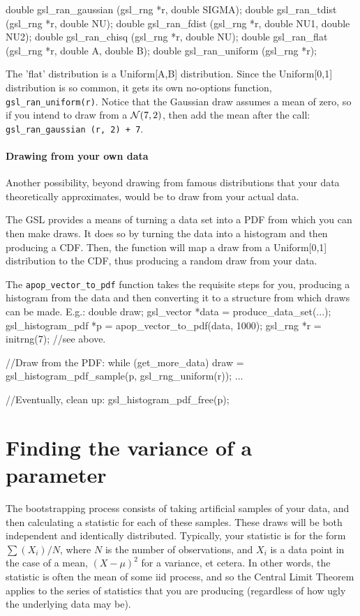 double gsl_ran_gaussian (gsl_rng *r, double SIGMA);
double gsl_ran_tdist (gsl_rng *r, double NU);
double gsl_ran_fdist (gsl_rng *r, double NU1, double NU2);
double gsl_ran_chisq (gsl_rng *r, double NU);
double gsl_ran_flat (gsl_rng *r, double A, double B);
double gsl_ran_uniform (gsl_rng *r);

The 'flat' distribution is a Uniform[A,B] distribution. Since the
Uniform[0,1] distribution is so common, it gets its own no-options
function, {\tt gsl\_ran\_uniform(r)}. Notice that the Gaussian draw
assumes a mean of zero, so if you intend to draw from a ${\cal N}(7,2)$,
then add the mean after the call: {\tt gsl\_ran\_gaussian (r, 2) + 7}.

\paragraph{Drawing from your own data} Another possibility, beyond
drawing from famous distributions that your data theoretically
approximates, would be to draw from your actual data. 

The GSL provides a means of turning a data set into a PDF from which you
can then make draws.  It
does so by turning the data into a histogram and then producing a CDF.
Then, the  function will
map a draw from a Uniform[0,1] distribution to the CDF, thus producing a
random draw from your data.

The {\tt apop\_\-vec\-tor\_\-to\_\-pdf} function takes the requisite steps
for you, producing a histogram from the data and then converting it to
a  structure from which draws can be
made. E.g.:
    double      draw;
    gsl_vector  *data    = produce_data_set(...);
    gsl_histogram_pdf *p = apop_vector_to_pdf(data, 1000);
    gsl_rng *r = initrng(7); //see above.

    //Draw from the PDF:
    while (get_more_data){
        draw = gsl_histogram_pdf_sample(p, gsl_rng_uniform(r));
        ...
    }

    //Eventually, clean up:
    gsl_histogram_pdf_free(p);



\section{Finding the variance of a parameter}
The bootstrapping process consists of taking artificial samples of your
data, and then calculating a statistic for each of these samples. These
draws will be both independent and identically distributed.  Typically,
your statistic is for the form $\sum (X_i)/ N$, where  $N$ is the number
of observations, and $X_i$ is a data point in the case of a mean,
$(X-\mu)^2$ for a variance, et cetera. In other words, the statistic
is often the mean of some iid process, and so the Central Limit Theorem
applies to the series of statistics that you are producing (regardless
of how ugly the underlying data may be).

